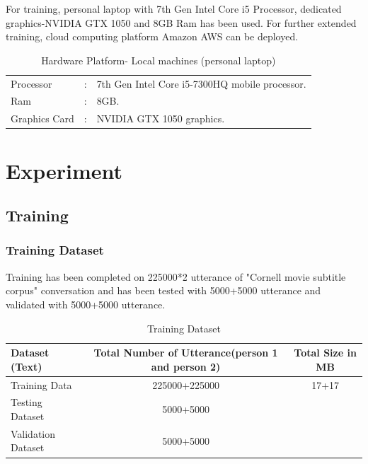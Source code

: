 \documentclass[a4paper,12pt]{report}
\begin{document}
\noindent For training, personal laptop with 7th Gen Intel Core i5 Processor,  dedicated graphics-NVIDIA GTX 1050 and 8GB Ram has been used. For further extended training, cloud computing platform Amazon AWS can be deployed. 
\begin{table}[!ht]
\caption{Hardware Platform- Local machines (personal laptop)}
\begin{center}
\begin{tabular}{|lll|}
\hline
Processor & : & 7th Gen Intel Core i5-7300HQ mobile processor.\\
Ram & : & 8GB.\\
Graphics Card & : & NVIDIA GTX 1050 graphics.\\
\hline
\end{tabular}
\end{center}
\end{table}

{\let\clearpage\relax \chapter {Experiment}}
\section {Training}
\subsection {Training Dataset}
Training has been completed on 225000*2 utterance of "Cornell movie subtitle corpus" conversation and has been tested with 5000+5000 utterance and validated with 5000+5000 utterance. 
\begin{center}
\begin{table}[H]
\begin{center}
\caption{Training Dataset}
\begin{tabular}{|l|c|c|}
\hline
Dataset (Text) & Total Number of Utterance(person 1 and person 2) & Total Size in MB\\
\hline
\hline
Training Data & 225000+225000 & 17+17\\
\hline
Testing Dataset & 5000+5000 & \\
\hline
Validation Dataset & 5000+5000 & \\
\hline
\end{tabular}
\end{center}
\end{table}
\end{center}
\end{document}
